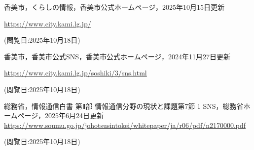 \begin{thebibliography}{99}
     香美市，くらしの情報，香美市公式ホームページ，2025年10月15日更新 
    
    \url{https://www.city.kami.lg.jp/}

    (閲覧日:2025年10月18日)
    
     香美市，香美市公式SNS，香美市公式ホームページ，2024年11月27日更新 
    
    \url{https://www.city.kami.lg.jp/soshiki/3/sns.html}

    (閲覧日:2025年10月18日) 
    
     総務省，情報通信白書 第Ⅱ部 情報通信分野の現状と課題第7節 1 SNS，総務省ホームページ，2025年6月24日更新
    \url{https://www.soumu.go.jp/johotsusintokei/whitepaper/ja/r06/pdf/n2170000.pdf}

    (閲覧日:2025年10月18日) 
\end{thebibliography}